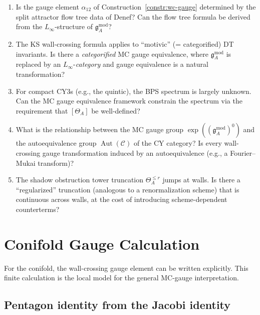 \documentclass[11pt]{article}
\theoremstyle{definition}
\theoremstyle{remark}
\newcommand{\frakg}{\mathfrak{g}}
\newcommand{\Linf}{L_\infty}
\newcommand{\cC}{\mathcal{C}}
\DeclareMathOperator{\Aut}{Aut}
\begin{document}
\begin{enumerate}[label=(Q\arabic*)]
\item Is the gauge element $\alpha_{12}$ of
 Construction~\ref{constr:wc-gauge} determined by the split attractor
 flow tree data of Denef? Can the flow tree formula be derived from
 the $\Linf$-structure of $\frakg^{\mathrm{mod}}_A$?

\item The KS wall-crossing formula applies to ``motivic''
 (= categorified) DT invariants. Is there a \emph{categorified} MC
 gauge equivalence, where $\frakg^{\mathrm{mod}}_A$ is replaced by an
 $\Linf$-\emph{category} and gauge equivalence is a natural
 transformation?

\item For compact CY3s (e.g., the quintic), the BPS spectrum is
 largely unknown. Can the MC gauge equivalence framework constrain
 the spectrum via the requirement that $[\Theta_A]$ be well-defined?

\item What is the relationship between the MC gauge group
 $\exp((\frakg^{\mathrm{mod}}_A)^0)$ and the autoequivalence group
 $\Aut(\cC)$ of the CY category? Is every wall-crossing gauge
 transformation induced by an autoequivalence (e.g., a
 Fourier--Mukai transform)?

\item The shadow obstruction tower truncation $\Theta^{\leq r}_A$ jumps at walls.
 Is there a ``regularized'' truncation (analogous to a renormalization
 scheme) that is continuous across walls, at the cost of introducing
 scheme-dependent counterterms?
\end{enumerate}

\section{Conifold Gauge Calculation}
\label{sec:wc-conifold-calculation}

For the conifold, the wall-crossing gauge element can be written explicitly.
This finite calculation is the local model for the general MC-gauge
interpretation.

\subsection{Pentagon identity from the Jacobi identity}
\end{document}
